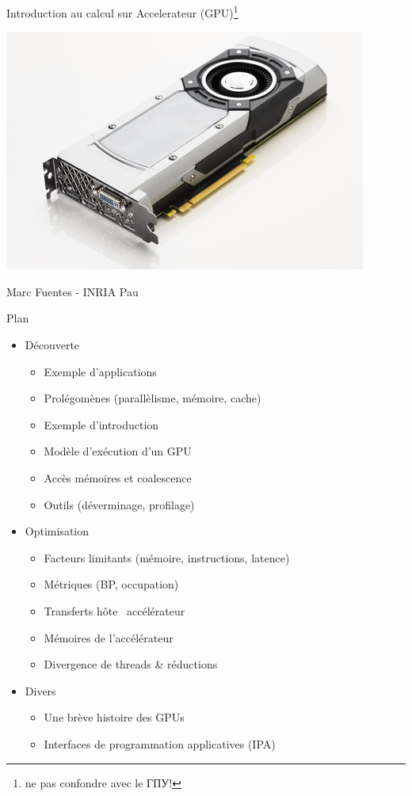 \documentclass[11pt,mathserif]{beamer}
\newcommand{\geziBikoitz}{\faArrowsH}
\begin{document}
\begin{frame}
\begin{center}
  {\Large Introduction au calcul sur Accelerateur (GPU)\footnote{ne pas confondre avec le ГПУ!} }
\end{center}
\begin{center}
\includegraphics[width=0.5\linewidth]{fig/gpu.jpg}
\end{center}
 \begin{center}
{\large Marc Fuentes - INRIA Pau\\ }
\end{center}
\end{frame}

\begin{frame}{Plan}
\begin{itemize}[<+->]
   \item Découverte
     \begin{itemize}
       \item Exemple d'applications 
       \item Prolégomènes (parallèlisme, mémoire, cache)
       \item Exemple d'introduction
       \item Modèle d'exécution d'un GPU
       \item Accès mémoires et coalescence
       \item Outils (déverminage, profilage)
     \end{itemize}
 \item Optimisation 
     \begin{itemize}
       \item Facteurs limitants (mémoire, instructions, latence)
       \item Métriques (BP, occupation)
       \item Transferts hôte \geziBikoitz\ accélérateur
       \item Mémoires de l'accélérateur
       \item Divergence de threads \& réductions
     \end{itemize}
  \item Divers
     \begin{itemize}
       \item Une brève histoire des GPUs
       \item Interfaces de programmation applicatives (IPA)
     \end{itemize}
\end{itemize}
\end{frame}
\end{document}
